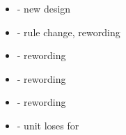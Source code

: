 

\subtitle{2023 \betaname{} 2}

\begin{itemize}
	  \item \forgewardens{} - new \forgegun{} design
	  \item \yercomingwithme{} - rule change, rewording
	  \item \majestyofhighkings{} - rewording
	  \item \runeofretribution{} - rewording
	  \item \sturdy{} - rewording
	  \item \runeofresolve{} - unit loses \scoring{} for \oneturn
\end{itemize}


